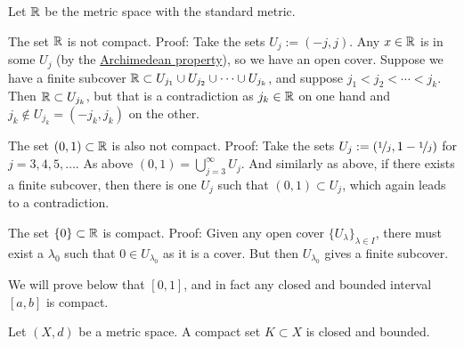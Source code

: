 \begin{example}
Let ${\mathbb{R}}$ be the metric space with the standard metric.

The set ${\mathbb{R}}$ is not compact.  Proof: Take the sets $U_j := (-j,j)$.
Any $x \in {\mathbb{R}}$ is in some $U_j$ (by the
\hyperref[thm:arch:i]{Archimedean property}), so we have an open cover.
Suppose we have a finite
subcover ${\mathbb{R}} \subset U_{j_1} \cup U_{j_2} \cup \cdots \cup U_{j_k}$,
and suppose $j_1 < j_2 < \cdots < j_k$.  Then ${\mathbb{R}} \subset U_{j_k}$, but that is
a contradiction as $j_k \in {\mathbb{R}}$ on one hand and $j_k \notin U_{j_k} =
(-j_k,j_k)$ on the
other.

The set $(0,1) \subset {\mathbb{R}}$ is also not compact.  Proof:  Take the 
sets $U_{j} := (\nicefrac{1}{j},1-\nicefrac{1}{j})$ for $j=3,4,5,\ldots$.
As above $(0,1) = \bigcup_{j=3}^\infty U_j$.  And similarly as above,
if there exists a finite subcover, then there is one $U_j$ such that $(0,1)
\subset U_j$, which again leads to a contradiction.

The set $\{ 0 \} \subset {\mathbb{R}}$ is compact.  Proof: Given any open cover $\{
U_{\lambda} \}_{\lambda \in I}$, there must exist a $\lambda_0$ such that $0
\in U_{\lambda_0}$ as it is a cover.  But then $U_{\lambda_0}$ gives a
finite subcover.

We will prove below that $[0,1]$, and in fact any closed and bounded
interval $[a,b]$ is compact.
\end{example}

\begin{prop}
Let $(X,d)$ be a metric space.  A compact set $K \subset X$ is closed and
bounded.
\end{prop}

